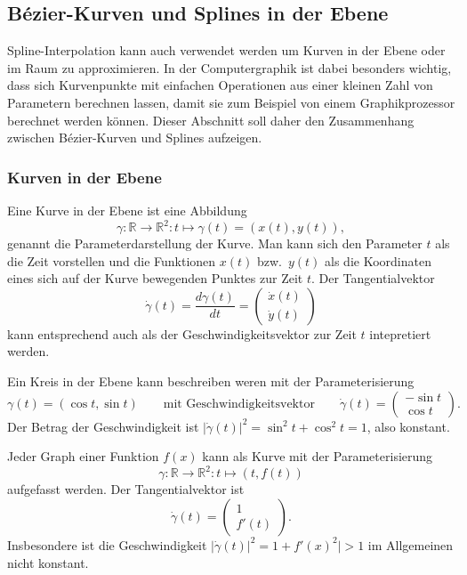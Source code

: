 %
%
%

\subsection{Bézier-Kurven und Splines in der Ebene
\label{buch:subsection:bezier}}
Spline-Interpolation kann auch verwendet werden um Kurven in der Ebene
oder im Raum zu approximieren.
In der Computergraphik ist dabei besonders wichtig, dass sich Kurvenpunkte
mit einfachen Operationen aus einer kleinen Zahl von Parametern berechnen
lassen, damit sie zum Beispiel von einem Graphikprozessor berechnet
werden können.
Dieser Abschnitt soll daher den Zusammenhang zwischen Bézier-Kurven und
Splines aufzeigen.

\subsubsection{Kurven in der Ebene}
Eine Kurve in der Ebene ist eine Abbildung
\[
\gamma \colon \mathbb R \to \mathbb R^2 : t \mapsto \gamma(t) = (x(t),y(t)),
\]
genannt die Parameterdarstellung der Kurve.
Man kann sich den Parameter $t$ als die Zeit vorstellen und die Funktionen
$x(t)$ bzw.~$y(t)$ als die Koordinaten eines sich auf der Kurve bewegenden
Punktes zur Zeit $t$.
Der Tangentialvektor
\[
\dot{\gamma}(t)
=
\frac{d\gamma(t)}{dt}
=
\begin{pmatrix}
\dot{x}(t)\\\dot{y}(t)
\end{pmatrix}
\]
kann entsprechend auch als der Geschwindigkeitsvektor zur Zeit $t$ 
intepretiert werden.

\begin{beispiel}
Ein Kreis in der Ebene kann beschreiben weren mit der Parameterisierung
\[
\gamma(t) = (\cos t, \sin t)
\qquad
\text{mit Geschwindigkeitsvektor}
\qquad
\dot{\gamma}(t)
=
\begin{pmatrix}
-\sin t\\\cos t
\end{pmatrix}.
\]
Der Betrag der Geschwindigkeit ist $|\dot{\gamma}(t)|^2=\sin^2t+\cos^2t=1$,
also konstant.
\end{beispiel}

\begin{beispiel}
Jeder Graph einer Funktion $f(x)$ kann als Kurve mit der Parameterisierung
\[
\gamma \colon \mathbb R\to\mathbb R^2 : t \mapsto (t, f(t))
\]
aufgefasst werden.
Der Tangentialvektor ist
\[
\dot{\gamma}(t)
=
\begin{pmatrix}
1\\f'(t)
\end{pmatrix}.
\]
Insbesondere ist die Geschwindigkeit $|\dot{\gamma}(t)|^2=1+f'(x)^2|>1$
im Allgemeinen nicht konstant.
\end{beispiel}

